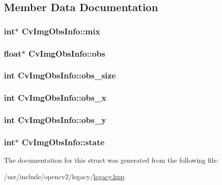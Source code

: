 \subsection{Member Data Documentation}
\hypertarget{structCvImgObsInfo_a30c5759006567c40458647ca51a13952}{
\subsubsection[{mix}]{\setlength{\rightskip}{0pt plus 5cm}int$\ast$ Cv\-Img\-Obs\-Info\-::mix}}\label{structCvImgObsInfo_a30c5759006567c40458647ca51a13952}
\hypertarget{structCvImgObsInfo_a89f0fc6c28d37239bbfb27740ce891b5}{
\subsubsection[{obs}]{\setlength{\rightskip}{0pt plus 5cm}float$\ast$ Cv\-Img\-Obs\-Info\-::obs}}\label{structCvImgObsInfo_a89f0fc6c28d37239bbfb27740ce891b5}
\hypertarget{structCvImgObsInfo_a2f2a1ec7d4a57340ad7b753bfb1e5efe}{
\subsubsection[{obs\-\_\-size}]{\setlength{\rightskip}{0pt plus 5cm}int Cv\-Img\-Obs\-Info\-::obs\-\_\-size}}\label{structCvImgObsInfo_a2f2a1ec7d4a57340ad7b753bfb1e5efe}
\hypertarget{structCvImgObsInfo_ab59ce8a12a9853445fedbe3fc10c9601}{
\subsubsection[{obs\-\_\-x}]{\setlength{\rightskip}{0pt plus 5cm}int Cv\-Img\-Obs\-Info\-::obs\-\_\-x}}\label{structCvImgObsInfo_ab59ce8a12a9853445fedbe3fc10c9601}
\hypertarget{structCvImgObsInfo_af926497a39e7abe5d707a9ad082882bc}{
\subsubsection[{obs\-\_\-y}]{\setlength{\rightskip}{0pt plus 5cm}int Cv\-Img\-Obs\-Info\-::obs\-\_\-y}}\label{structCvImgObsInfo_af926497a39e7abe5d707a9ad082882bc}
\hypertarget{structCvImgObsInfo_a2ebc3a7cc6e29a9c57b6e356f09b73ce}{
\subsubsection[{state}]{\setlength{\rightskip}{0pt plus 5cm}int$\ast$ Cv\-Img\-Obs\-Info\-::state}}\label{structCvImgObsInfo_a2ebc3a7cc6e29a9c57b6e356f09b73ce}


The documentation for this struct was generated from the following file\-:\begin{DoxyCompactItemize}
\item 
/usr/include/opencv2/legacy/\hyperlink{legacy_8hpp}{legacy.\-hpp}\end{DoxyCompactItemize}
